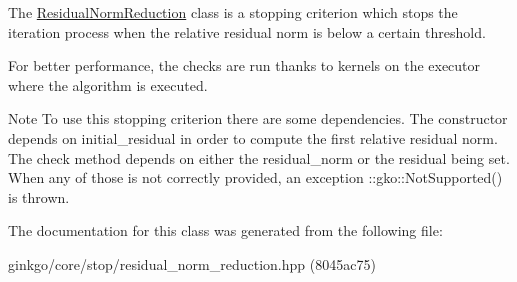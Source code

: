 The \hyperlink{classgko_1_1stop_1_1ResidualNormReduction}{Residual\+Norm\+Reduction} class is a stopping criterion which stops the iteration process when the relative residual norm is below a certain threshold. 

For better performance, the checks are run thanks to kernels on the executor where the algorithm is executed.

\begin{DoxyNote}{Note}
To use this stopping criterion there are some dependencies. The constructor depends on {\ttfamily initial\+\_\+residual} in order to compute the first relative residual norm. The check method depends on either the {\ttfamily residual\+\_\+norm} or the {\ttfamily residual} being set. When any of those is not correctly provided, an exception \+::gko\+::\+Not\+Supported() is thrown. 
\end{DoxyNote}


The documentation for this class was generated from the following file\+:\begin{DoxyCompactItemize}
\item 
ginkgo/core/stop/residual\+\_\+norm\+\_\+reduction.\+hpp (8045ac75)\end{DoxyCompactItemize}

